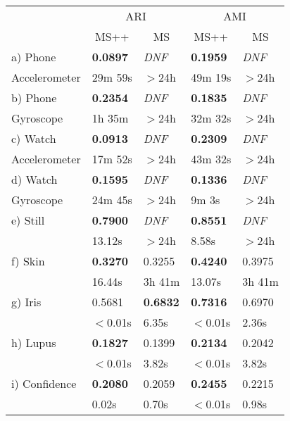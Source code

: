 \begin{table}
\footnotesize
\begin{tabular}{ |p{2.2cm}||p{0.95cm}|p{1.0cm}||p{0.95cm}|p{1.0cm}| }
        \cline{2-5}
        \multicolumn{1}{c}{} & \multicolumn{2}{|c||}{ARI} & \multicolumn{2}{c|}{AMI}  \\
        \cline{2-5}
        \multicolumn{1}{c}{} & \multicolumn{1}{|c|}{MS++} & \multicolumn{1}{c||}{MS} & \multicolumn{1}{c|}{MS++} & \multicolumn{1}{c|}{MS} \\
        \hline
        a) Phone & \textbf{0.0897} & \textit{DNF} & \textbf{0.1959} & \textit{DNF} \\
        Accelerometer & 29m 59s & $>$24h & 49m 19s & $>$24h \\
        \hline
        b) Phone & \textbf{0.2354} & \textit{DNF} & \textbf{0.1835} & \textit{DNF} \\
        Gyroscope & 1h 35m & $>$24h & 32m 32s & $>$24h \\
        \hline
        c) Watch & \textbf{0.0913} & \textit{DNF} & \textbf{0.2309} & \textit{DNF} \\
        Accelerometer & 17m 52s & $>$24h & 43m 32s & $>$24h \\
        \hline
        d) Watch & \textbf{0.1595} & \textit{DNF} & \textbf{0.1336} & \textit{DNF} \\
        Gyroscope & 24m 45s & $>$24h & 9m 3s & $>$24h \\
        \hline
        e) Still & \textbf{0.7900} & \textit{DNF} & \textbf{0.8551} & \textit{DNF} \\
        & 13.12s & $>$24h & 8.58s & $>$24h \\
        \hline
        f) Skin & \textbf{0.3270} & 0.3255 & \textbf{0.4240} &0.3975 \\
        & 16.44s & 3h 41m & 13.07s & 3h 41m \\
        \hline
        g) Iris & 0.5681 & \textbf{0.6832} & \textbf{0.7316} & 0.6970 \\
        & $<$0.01s & 6.35s & $<$0.01s & 2.36s \\
        \hline
        h) Lupus & \textbf{0.1827} & 0.1399 & \textbf{0.2134} & 0.2042 \\
        & $<$0.01s & 3.82s & $<$0.01s & 3.82s \\
        \hline
        i) Confidence & \textbf{0.2080} & 0.2059 & \textbf{0.2455} & 0.2215 \\
        & 0.02s & 0.70s & $<$0.01s & 0.98s \\
        \hline

\end{tabular}
\end{table}
